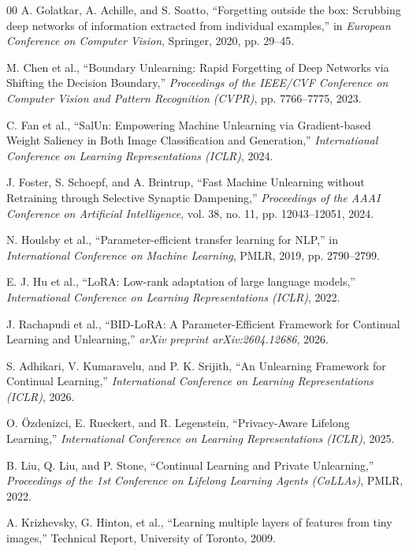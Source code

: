 \documentclass[conference]{IEEEtran}
\theoremstyle{plain}
\theoremstyle{definition}
\theoremstyle{remark}
\begin{document}
\begin{thebibliography}{00}
A. Golatkar, A. Achille, and S. Soatto, ``Forgetting outside the box: Scrubbing deep networks of information extracted from individual examples,'' in \textit{European Conference on Computer Vision}, Springer, 2020, pp. 29--45.

M. Chen et al., ``Boundary Unlearning: Rapid Forgetting of Deep Networks via Shifting the Decision Boundary,'' \textit{Proceedings of the IEEE/CVF Conference on Computer Vision and Pattern Recognition (CVPR)}, pp. 7766--7775, 2023.

C. Fan et al., ``SalUn: Empowering Machine Unlearning via Gradient-based Weight Saliency in Both Image Classification and Generation,'' \textit{International Conference on Learning Representations (ICLR)}, 2024.

J. Foster, S. Schoepf, and A. Brintrup, ``Fast Machine Unlearning without Retraining through Selective Synaptic Dampening,'' \textit{Proceedings of the AAAI Conference on Artificial Intelligence}, vol. 38, no. 11, pp. 12043--12051, 2024.

N. Houlsby et al., ``Parameter-efficient transfer learning for NLP,'' in \textit{International Conference on Machine Learning}, PMLR, 2019, pp. 2790--2799.

E. J. Hu et al., ``LoRA: Low-rank adaptation of large language models,'' \textit{International Conference on Learning Representations (ICLR)}, 2022.

J. Rachapudi et al., ``BID-LoRA: A Parameter-Efficient Framework for Continual Learning and Unlearning,'' \textit{arXiv preprint arXiv:2604.12686}, 2026.

S. Adhikari, V. Kumaravelu, and P. K. Srijith, ``An Unlearning Framework for Continual Learning,'' \textit{International Conference on Learning Representations (ICLR)}, 2026.

O. Özdenizci, E. Rueckert, and R. Legenstein, ``Privacy-Aware Lifelong Learning,'' \textit{International Conference on Learning Representations (ICLR)}, 2025.

B. Liu, Q. Liu, and P. Stone, ``Continual Learning and Private Unlearning,'' \textit{Proceedings of the 1st Conference on Lifelong Learning Agents (CoLLAs)}, PMLR, 2022.

A. Krizhevsky, G. Hinton, et al., ``Learning multiple layers of features from tiny images,'' Technical Report, University of Toronto, 2009.


\end{thebibliography}
\end{document}
